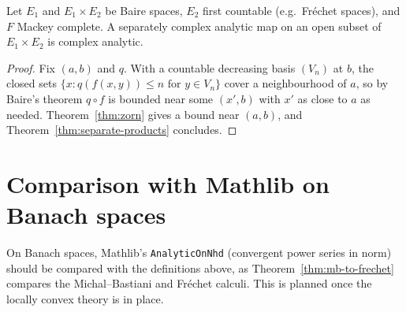 \begin{theorem}
  \label{thm:hartogs-products}
  \leanok
  Let $E_1$ and $E_1 \times E_2$ be Baire spaces, $E_2$ first countable (e.g.\ Fréchet spaces), and
  $F$ Mackey complete. A separately complex analytic map on an open subset of $E_1 \times E_2$ is
  complex analytic.
\end{theorem}

\begin{proof}
  \leanok
  Fix $(a, b)$ and $q$. With a countable decreasing basis $(V_n)$ at $b$, the closed sets
  $\{x : q(f(x, y)) \le n \text{ for } y \in V_n\}$ cover a neighbourhood of $a$, so by Baire's
  theorem $q \circ f$ is bounded near some $(x', b)$ with $x'$ as close to $a$ as needed.
  Theorem~\ref{thm:zorn} gives a bound near $(a, b)$, and Theorem~\ref{thm:separate-products}
  concludes.
\end{proof}

\section{Comparison with Mathlib on Banach spaces}

On Banach spaces, Mathlib's \texttt{AnalyticOnNhd} (convergent power series in norm) should be
compared with the definitions above, as Theorem~\ref{thm:mb-to-frechet} compares the Michal--Bastiani and
Fréchet calculi. This is planned once the locally convex theory is in place.
